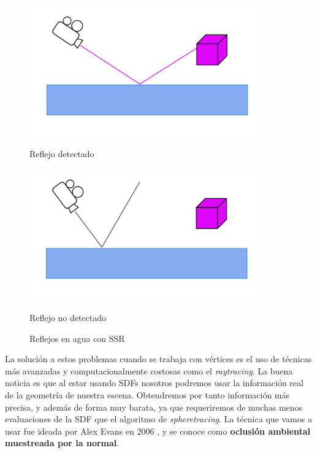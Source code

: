 \begin{figure}[!h]
     \begin{minipage}[c]{0.49\linewidth}
        \centering
        \includegraphics[width=0.9\textwidth]{Plantilla-TFG-master/img/ssr2.png}
        \caption{Reflejo detectado}
     \end{minipage}
     \begin{minipage}[c]{0.49\linewidth}
        \centering
        \includegraphics[width=0.9\textwidth]{Plantilla-TFG-master/img/ssr3.png}
        \caption{Reflejo no detectado}
     \end{minipage}
     \caption{Reflejos en agua con SSR}
     \label{fig:ssrEsquema}
\end{figure}

La solución a estos problemas cuando se trabaja con vértices es el uso de técnicas más avanzadas y computacionalmente costosas como el \textit{raytracing}. La buena noticia es que al estar usando SDFs nosotros podremos usar la información real de la geometría de nuestra escena. Obtendremos por tanto información más precisa, y además de forma muy barata, ya que requeriremos de muchas menos evaluaciones de la SDF que el algoritmo de \textit{spheretracing}. La técnica que vamos a usar fue ideada por Alex Evans en 2006 \cite{ao}, y se conoce como \textbf{oclusión ambiental muestreada por la normal}.\newline

